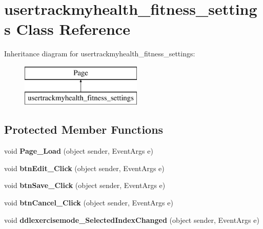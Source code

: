\hypertarget{classusertrackmyhealth__fitness__settings}{\section{usertrackmyhealth\-\_\-fitness\-\_\-settings Class Reference}
\label{classusertrackmyhealth__fitness__settings}
}
Inheritance diagram for usertrackmyhealth\-\_\-fitness\-\_\-settings\-:\begin{figure}[H]
\begin{center}
\leavevmode
\includegraphics[height=2.000000cm]{classusertrackmyhealth__fitness__settings}
\end{center}
\end{figure}
\subsection*{Protected Member Functions}
\begin{DoxyCompactItemize}
\item 
\hypertarget{classusertrackmyhealth__fitness__settings_aef8f23b321b8f82c50c7ff31db9b21db}{void {\bfseries Page\-\_\-\-Load} (object sender, Event\-Args e)}\label{classusertrackmyhealth__fitness__settings_aef8f23b321b8f82c50c7ff31db9b21db}

\item 
\hypertarget{classusertrackmyhealth__fitness__settings_abdb100e34b8252c8dd02eb7c0c26339f}{void {\bfseries btn\-Edit\-\_\-\-Click} (object sender, Event\-Args e)}\label{classusertrackmyhealth__fitness__settings_abdb100e34b8252c8dd02eb7c0c26339f}

\item 
\hypertarget{classusertrackmyhealth__fitness__settings_ae4f59c160ffc42cb6f5a5e1327d5da97}{void {\bfseries btn\-Save\-\_\-\-Click} (object sender, Event\-Args e)}\label{classusertrackmyhealth__fitness__settings_ae4f59c160ffc42cb6f5a5e1327d5da97}

\item 
\hypertarget{classusertrackmyhealth__fitness__settings_a96e321e45a4ce6d9fb34e3103322fb79}{void {\bfseries btn\-Cancel\-\_\-\-Click} (object sender, Event\-Args e)}\label{classusertrackmyhealth__fitness__settings_a96e321e45a4ce6d9fb34e3103322fb79}

\item 
\hypertarget{classusertrackmyhealth__fitness__settings_a9a1fb22b884901618a4a3980d5f26620}{void {\bfseries ddlexercisemode\-\_\-\-Selected\-Index\-Changed} (object sender, Event\-Args e)}\label{classusertrackmyhealth__fitness__settings_a9a1fb22b884901618a4a3980d5f26620}

\end{DoxyCompactItemize}


